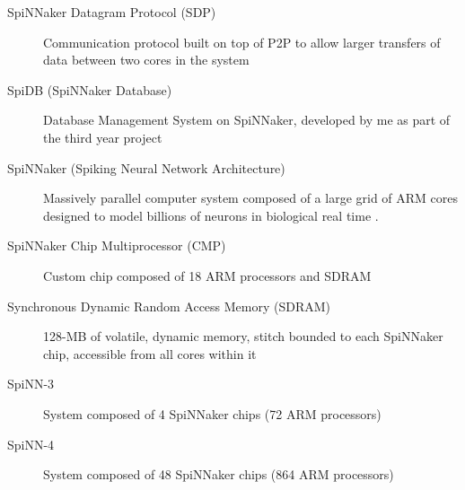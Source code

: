 \begin{description}
  \item[SpiNNaker Datagram Protocol (SDP)] Communication protocol built on top of P2P to allow larger transfers of data between two cores in the system  

  \item[SpiDB (SpiNNaker Database)] Database Management System on SpiNNaker, developed by me as part of the third year project

  \item[SpiNNaker (Spiking Neural Network Architecture)] Massively parallel computer system composed of a large grid of ARM cores designed to model billions of neurons in biological real time \cite{painkras}.

  \item[SpiNNaker Chip Multiprocessor (CMP)] Custom chip composed of 18 ARM processors and SDRAM  

  \item[Synchronous Dynamic Random Access Memory (SDRAM)] 128-MB of volatile, dynamic memory, stitch bounded to each SpiNNaker chip, accessible from all cores within it

  \item[SpiNN-3] System composed of 4 SpiNNaker chips (72 ARM processors)
  \item[SpiNN-4] System composed of 48 SpiNNaker chips (864 ARM processors)  

\end{description}